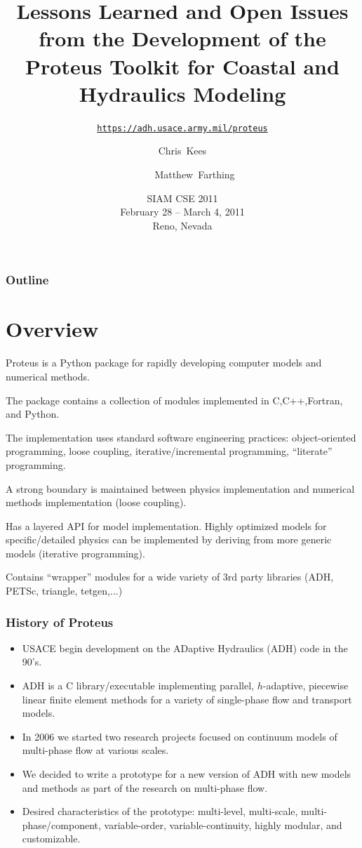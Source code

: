 \documentclass{beamer}
\title[petsc4py]{Lessons Learned and Open Issues from the Development of the Proteus Toolkit for Coastal and Hydraulics Modeling}
\subtitle[]{\href{https://adh.usace.army.mil/proteus}%
           {\texttt{https://adh.usace.army.mil/proteus}}}
\author[C.~Kees \and M.~Farthing]%
{
  Chris~Kees \and ~~~~~Matthew~Farthing\\ 
  \email{christopher.e.kees@usace.army.mil} \and \email{matthew.w.farthing@usace.army.mil}
}
\institute[ERDC]
{
  Coastal and Hydraulics Laboratory\\
  US Army Engineer Research and Development Center\\
  Vicksburg, MS
}
\date [CSE '11]
{
  SIAM CSE 2011\\
  February 28 -- March 4, 2011\\
  Reno, Nevada
}
\begin{document}
\begin{frame}
  \titlepage
\end{frame}

\begin{frame}
  \frametitle{Outline}
  \tableofcontents
\end{frame}

\section{Overview}

\begin{frame}
\bit
\item Proteus is a Python package for rapidly developing computer models and numerical methods.
\item The package contains a collection of modules implemented in C,C++,Fortran, and Python.
\item The implementation uses standard software engineering practices:
  object-oriented programming, loose coupling, iterative/incremental
  programming, ``literate'' programming.
\item A strong boundary is maintained between physics implementation
  and numerical methods implementation (loose coupling).
\item Has a layered API for model implementation. Highly optimized
  models for specific/detailed physics can be implemented by deriving
  from more generic models (iterative programming).
\item Contains ``wrapper'' modules for a wide variety of 3rd party
  libraries (ADH, PETSc, triangle, tetgen,...)  \eit
\end{frame}

\begin{frame}
\frametitle{History of Proteus}
\begin{itemize}
\item USACE begin development on the ADaptive Hydraulics (ADH) code in
  the 90's.
\item ADH is a C library/executable implementing parallel,
  $h$-adaptive, piecewise linear finite element methods for a variety
  of single-phase flow and transport models.
\item In 2006 we started two research projects focused on continuum
  models of multi-phase flow at various scales.
\item We decided to write a prototype for a new version of ADH with
  new models and methods as part of the research on multi-phase flow.
\item Desired characteristics of the prototype: multi-level,
  multi-scale, multi-phase/component, variable-order,
  variable-continuity, highly modular, and customizable.
\end{itemize}
\end{frame}
\end{document}
